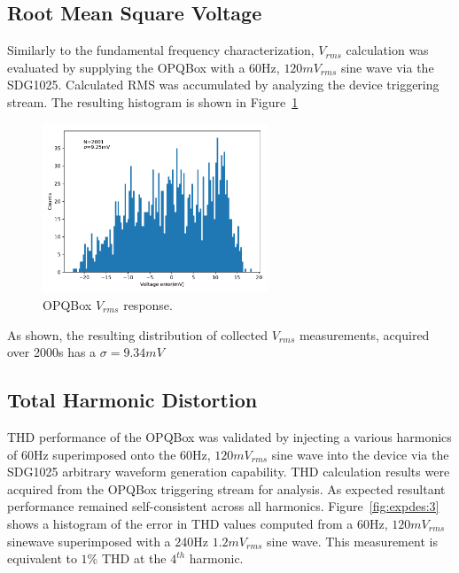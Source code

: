 \subsection{Root Mean Square Voltage}
Similarly to the fundamental frequency characterization, $V_{rms}$ calculation was evaluated by supplying the OPQBox with a 60Hz, $120mV_{rms}$ sine wave via the SDG1025.
Calculated RMS was accumulated by analyzing the device triggering stream.
The resulting histogram is shown in Figure~\ref{fig:expdes:2}

\begin{figure}[ht!]
    \begin{center}
        \includegraphics[width=0.6\textwidth]{img/box_eval/rms_histogram.pdf}
    \end{center}
    \caption{OPQBox $V_{rms}$ response.}
    \label{fig:expdes:2}
\end{figure}

As shown, the resulting distribution of collected $V_{rms}$ measurements, acquired over 2000s has a $\sigma=9.34mV$

\subsection{Total Harmonic Distortion}

THD performance of the OPQBox was validated by injecting a various harmonics of 60Hz superimposed onto the 60Hz, $120mV_{rms}$ sine wave into the device via the SDG1025 arbitrary waveform generation capability.
THD calculation results were acquired from the OPQBox triggering stream for analysis.
As expected resultant performance remained self-consistent across all harmonics.
Figure~\ref{fig:expdes:3} shows a histogram of the error in THD values computed from a 60Hz, $120mV_{rms}$ sinewave superimposed with a 240Hz $1.2mV_{rms}$ sine wave.
This measurement is equivalent to $1\%$ THD at the $4^{th}$ harmonic.

